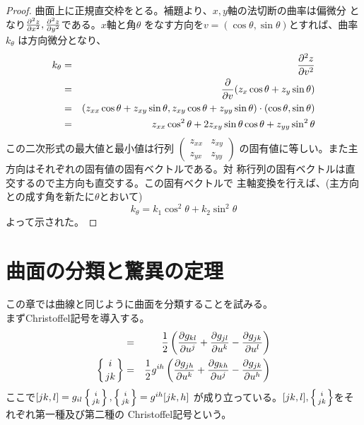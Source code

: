             \begin{proof}
                曲面上に正規直交枠をとる。補題より、$x,y$軸の法切断の曲率は偏微分
                となり$\pd[^2z]{x^2},\pd[^2z]{y^2}$である。$x$軸と角$\theta$
                をなす方向を$v=(\cos\theta,\sin\theta)$とすれば、曲率$k_\theta$
                は方向微分となり、
                \begin{eqnarray*}
                    k_\theta &=& \pd[^2z]{v^2}\\
                    &=& \pd{v} (z_x\cos\theta + z_y\sin\theta)\\
                    &=& (z_{xx}\cos\theta + z_{xy}\sin\theta,
                    z_{xy}\cos\theta + z_{yy}\sin\theta)
                    \cdot(\cos\theta,\sin\theta)\\
                    &=& z_{xx}\cos^2\theta + 2z_{xy}\sin\theta\cos\theta + z_{yy}\sin^2\theta
                \end{eqnarray*}
                この二次形式の最大値と最小値は行列
                $\begin{pmatrix}z_{xx} & z_{xy}\\ z_{yx} & z_{yy}\end{pmatrix}$
                の固有値に等しい。また主方向はそれぞれの固有値の固有ベクトルである。対
                称行列の固有ベクトルは直交するので主方向も直交する。この固有ベクトルで
                主軸変換を行えば、(主方向との成す角を新たに$\theta$とおいて)
                    \[k_\theta = k_1\cos^2\theta + k_2\sin^2\theta\]
                よって示された。
            \end{proof}
            
            
    \section{曲面の分類と驚異の定理}
        この章では曲線と同じように曲面を分類することを試みる。\\
        まずChristoffel記号を導入する。
        \begin{eqnarray*}
            [jk,l] &=& \rec{2}\lr{\pd[g_{kl}]{u^j}+\pd[g_{jl}]{u^k}
            -\pd[g_{jk}]{u^l}}\\
            \chr{i}{jk} &=& \rec{2}g^{ih}\lr{\pd[g_{jh}]{u^k}+\pd[g_{kh}]{u^j}
            -\pd[g_{jk}]{u^h}}
        \end{eqnarray*}
        ここで$[jk,l]=g_{il}\chr{i}{jk},\chr{i}{jk}=g^{ih}[jk,h]$
        が成り立っている。$[jk,l],\chr{i}{jk}$をそれぞれ第一種及び第二種の
        Christoffel記号という。


